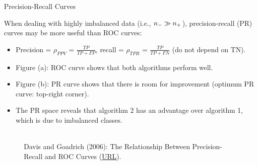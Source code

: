 \begin{vbframe}{Precision-Recall Curves}


\begin{footnotesize}

When dealing with highly imbalanced data (i.e., $n_{-} \gg n_{+}$), precision-recall 
(PR) curves may be more useful than ROC curves:

\begin{itemize}
  \item Precision = $\rho_{PPV}$ = $\frac{TP}{TP + FP}$, recall = $\rho_{TPR}$ = $\frac{TP}{TP + FN}$ 
  (do not depend on TN).
  \item Figure (a): ROC curve shows that both algorithms perform well.
  \item Figure (b): PR curve shows that there is room for improvement (optimum 
  PR curve: top-right corner).
  \item The PR space reveals that algorithm 2 has an advantage over algorithm 1, 
  which is due to imbalanced classes.
\end{itemize}

\end{footnotesize}

\begin{figure}
  \centering
  \tiny
  \\Davis and Goadrich (2006): The Relationship Between Precision-Recall and 
  ROC Curves (\href{https://www.biostat.wisc.edu/~page/rocpr.pdf}
  {\underline{URL}}).
\end{figure}


\end{vbframe}
